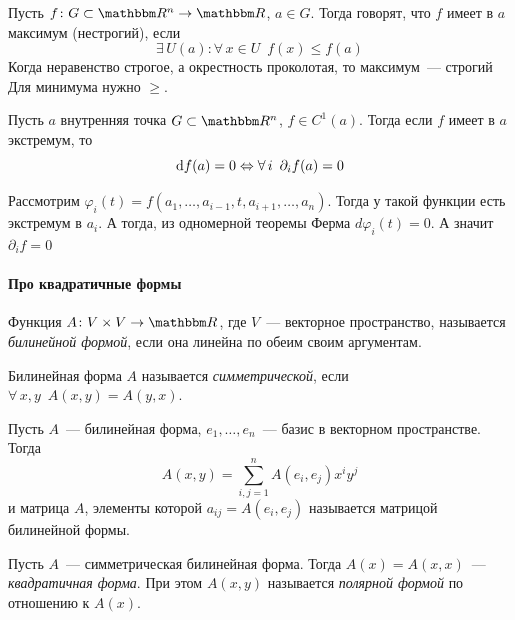 \documentclass[12pt,timbord]{../../../notes}
\begin{document}
\begin{defn}\label{defn:diffspace::extrema}
  Пусть $f\colon G \subset \R^n \to \R$, $a\in G$. Тогда говорят, что $f$ имеет в $a$ максимум (нестрогий), если
  \[
    \exists\, U(a) \colon \forall\, x \in U \;\: f(x) \leqslant f(a)
  \]
  Когда неравенство строгое, а окрестность проколотая, то максимум~--- строгий
  Для минимума нужно $\geqslant$.
\end{defn}

\begin{thrm}\label{thrm:diffspace::extrema::ness}
  Пусть $a$ внутренняя точка $G \subset \R^n$, $f\in C^1(a)$. Тогда если $f$ имеет в $a$ экстремум, то
  \[
    \mathrm{d} f(a) = 0 \Leftrightarrow \forall\,i \;\: \partial_i f(a) = 0
  \]
\end{thrm}
\begin{ittproof}
  Рассмотрим $\varphi_i(t) = f(a_1, \dotsc, a_{i-1}, t, a_{i+1}, \dotsc, a_n)$. Тогда у такой
  функции есть экстремум в $a_i$. А тогда, из одномерной теоремы Ферма $d \varphi_i(t) = 0$. А
  значит $\partial_i f =0$
\end{ittproof}


\paragraph{Про квадратичные формы }
\label{par:diffspace::quadforms}
\begin{defn}\label{defn:diffspace::quadforms::bilin} 
  Функция $A\colon V \times V \to \R$, где $V$~--- векторное пространство,
  называется \emph{билинейной формой}, если она линейна по обеим своим аргументам.
\end{defn}

\begin{defn}\label{defn:diffspace::quadforms::bilinsym}
  Билинейная форма $A$ называется \emph{симметрической}, если $\forall\, x, y \;\: A(x,y)=A(y,x)$.
\end{defn}

\begin{defn}\label{defn:diffspace::quadforms::bilinmtx}
  Пусть $A$~--- билинейная форма, $e_1, \dotsc, e_n$~--- базис в векторном пространстве.
  Тогда \[
    A (x,y) = \sum_{i,j=1}^n A(e_i, e_j) x^i y^j
  \]
  и матрица $A$, элементы которой $a_{ij} =  A(e_i, e_j)$ называется матрицой билинейной формы.
\end{defn}

\begin{defn}\label{defn:diffspace::quadforms::quad}
  Пусть $A$~--- симметрическая билинейная форма. Тогда $A(x)=A(x,x)$~--- \emph{квадратичная форма}.
  При этом $A(x,y)$ называется \emph{полярной формой} по отношению к $A(x)$.
\end{defn}
\end{document}
